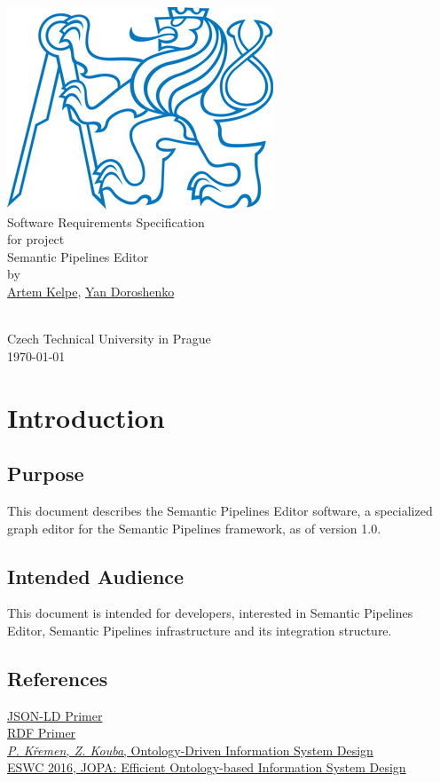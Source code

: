 \documentclass{article}
\begin{document}
\begin{center}
    \rule{0pt}{0pt}
    \vfill
    \includegraphics[scale=0.9]{logo.png}\\
    {\huge Software Requirements Specification\\}
    for project\\
    {\Large Semantic Pipelines Editor\\}
    by\\
    {\large\href{mailto:kelpeart@fel.cvut.cz}{Artem Kelpe}, \href{mailto:dorosyan@fel.cvut.cz}{Yan Doroshenko}\\}
    \vfill
    \rule{0pt}{90pt}\\
    {\large Czech Technical University in Prague\\} \today
\end{center}
\newpage
\tableofcontents
\newpage
{}
\setcounter{page}{3}
\section{Introduction}
\subsection{Purpose}
This document describes the Semantic Pipelines Editor software, a specialized graph editor for the Semantic Pipelines framework, as of version 1.0.
\subsection{Intended Audience}
This document is intended for developers, interested in Semantic Pipelines Editor, Semantic Pipelines infrastructure and its integration structure.
\subsection{References}
\href{http://json-ld.org/primer/latest/}{JSON-LD Primer}\\
\href{https://www.w3.org/TR/rdf11-primer/}{RDF Primer}\\
\href{http://ieeexplore.ieee.org/document/6011704/?arnumber=6011704\&tag=1}{\textit{P. Křemen, Z. Kouba}, Ontology-Driven Information System Design}\\
\href{http://2016.eswc-conferences.org/sites/default/files/papers/Accepted\%20Posters\%20and\%20Demos/ESWC2016\_DEMO\_JOPA.pdf}{ESWC 2016, JOPA: Efficient Ontology-based Information System Design}
\end{document}
